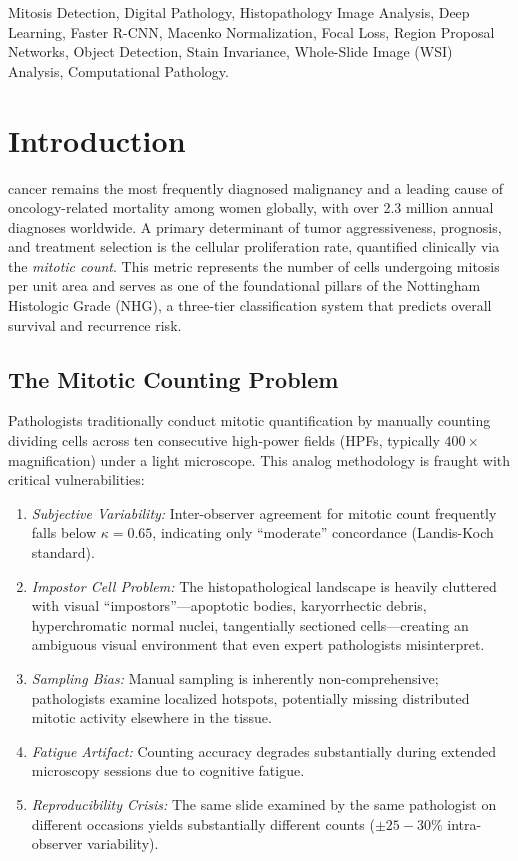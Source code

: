 \documentclass[journal]{IEEEtran}
\begin{document}
\begin{IEEEkeywords}
Mitosis Detection, Digital Pathology, Histopathology Image Analysis, Deep Learning, Faster R-CNN, Macenko Normalization, Focal Loss, Region Proposal Networks, Object Detection, Stain Invariance, Whole-Slide Image (WSI) Analysis, Computational Pathology.
\end{IEEEkeywords}

\section{Introduction}
 cancer remains the most frequently diagnosed malignancy and a leading cause of oncology-related mortality among women globally, with over 2.3 million annual diagnoses worldwide. A primary determinant of tumor aggressiveness, prognosis, and treatment selection is the cellular proliferation rate, quantified clinically via the \textit{mitotic count}. This metric represents the number of cells undergoing mitosis per unit area and serves as one of the foundational pillars of the Nottingham Histologic Grade (NHG), a three-tier classification system that predicts overall survival and recurrence risk.

\subsection{The Mitotic Counting Problem}
Pathologists traditionally conduct mitotic quantification by manually counting dividing cells across ten consecutive high-power fields (HPFs, typically $400 \times$ magnification) under a light microscope. This analog methodology is fraught with critical vulnerabilities:

\begin{enumerate}
\item \textit{Subjective Variability:} Inter-observer agreement for mitotic count frequently falls below $\kappa = 0.65$, indicating only ``moderate'' concordance (Landis-Koch standard).

\item \textit{Impostor Cell Problem:} The histopathological landscape is heavily cluttered with visual ``impostors''---apoptotic bodies, karyorrhectic debris, hyperchromatic normal nuclei, tangentially sectioned cells---creating an ambiguous visual environment that even expert pathologists misinterpret.

\item \textit{Sampling Bias:} Manual sampling is inherently non-comprehensive; pathologists examine localized hotspots, potentially missing distributed mitotic activity elsewhere in the tissue.

\item \textit{Fatigue Artifact:} Counting accuracy degrades substantially during extended microscopy sessions due to cognitive fatigue.

\item \textit{Reproducibility Crisis:} The same slide examined by the same pathologist on different occasions yields substantially different counts ($\pm 25-30\%$ intra-observer variability).
\end{enumerate}
\end{document}
